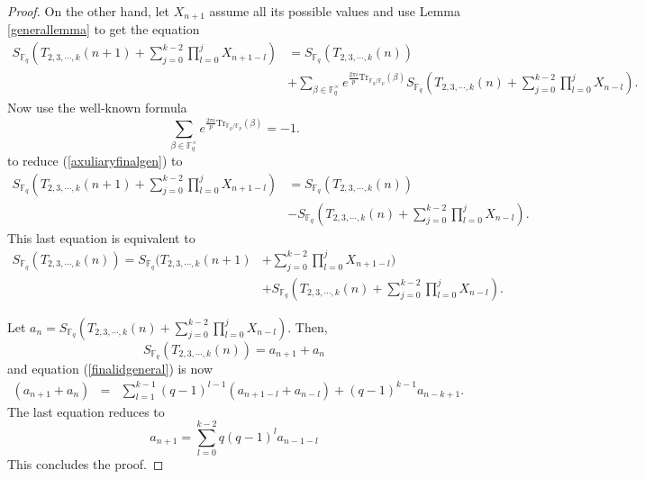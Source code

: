 \begin{proof}
On the other hand, let $X_{n+1}$ assume all its possible values and use Lemma \ref{generallemma} to get the equation
\begin{align}\nonumber
\label{axuliaryfinalgen}
S_{\mathbb{F}_q}(T_{2,3,\cdots,k}(n+1)+\sum_{j=0}^{k-2}\prod_{l=0}^j X_{n+1-l})&= S_{\mathbb{F}_q}(T_{2,3,\cdots,k}(n))\\
&+\sum_{\beta \in \mathbb{F}_q^{\times}}e^{\frac{2\pi i}{p}\text{Tr}_{\mathbb{F}_q/\mathbb{F}_p}(\beta)}S_{\mathbb{F}_q}\left(T_{2,3,\cdots,k}(n)+\sum_{j=0}^{k-2}\prod_{l=0}^j X_{n-l}\right).
\end{align}
Now use the well-known formula
\begin{equation}
\sum_{\beta\in\mathbb{F}_q^{\times}} e^{\frac{2\pi i}{p}\text{Tr}_{\mathbb{F}_q/\mathbb{F}_p}(\beta)}=-1.
\end{equation}  
to reduce (\ref{axuliaryfinalgen}) to 
\begin{align}
 S_{\mathbb{F}_q}(T_{2,3,\cdots,k}(n+1)+\sum_{j=0}^{k-2}\prod_{l=0}^j X_{n+1-l})&= S_{\mathbb{F}_q}(T_{2,3,\cdots,k}(n))\\\nonumber
 & - S_{\mathbb{F}_q}\left(T_{2,3,\cdots,k}(n)+\sum_{j=0}^{k-2}\prod_{l=0}^j X_{n-l}\right).
\end{align}
This last equation is equivalent to 
\begin{align}
\label{axuliaryfinalgen2}
 S_{\mathbb{F}_q}(T_{2,3,\cdots,k}(n))= S_{\mathbb{F}_q}(T_{2,3,\cdots,k}(n+1)&+\sum_{j=0}^{k-2}\prod_{l=0}^j X_{n+1-l})\\\nonumber
 & +S_{\mathbb{F}_q}\left(T_{2,3,\cdots,k}(n)+\sum_{j=0}^{k-2}\prod_{l=0}^j X_{n-l}\right).
\end{align}

Let $a_n = S_{\mathbb{F}_q}\left(T_{2,3,\cdots,k}(n)+\sum_{j=0}^{k-2}\prod_{l=0}^j X_{n-l}\right)$. Then,
\begin{equation}
 S_{\mathbb{F}_q}(T_{2,3,\cdots,k}(n))=a_{n+1}+a_n
\end{equation}
and equation (\ref{finalidgeneral}) is now
\begin{eqnarray}
 (a_{n+1}+a_n)&=&\sum_{l=1}^{k-1}(q-1)^{l-1}(a_{n+1-l}+a_{n-l})+(q-1)^{k-1} a_{n-k+1}.
\end{eqnarray}
The last equation reduces to
\begin{equation}
 a_{n+1}=\sum_{l=0}^{k-2} q(q-1)^{l}a_{n-1-l}
\end{equation}
This concludes the proof.
\end{proof}

